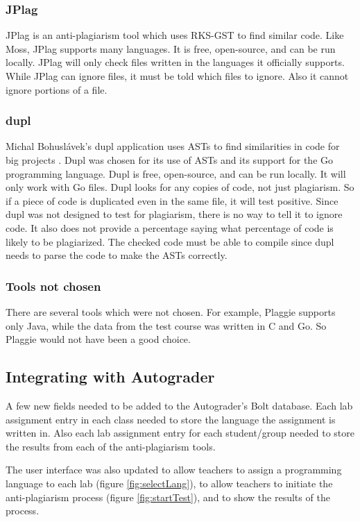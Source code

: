 \documentclass[10pt,journal,compsoc]{IEEEtran}
\begin{document}
			\subsubsection{JPlag}
			JPlag is an anti-plagiarism tool which uses RKS-GST to find similar code. Like Moss, JPlag supports many languages. It is free, open-source, and can be run locally. JPlag will only check files written in the languages it officially supports. While JPlag can ignore files, it must be told which files to ignore. Also it cannot ignore portions of a file.
		
			\subsubsection{dupl}
			Michal Bohuslávek's dupl application uses ASTs to find similarities in code for big projects \cite{bohuslave}. Dupl was chosen for its use of ASTs and its support for the Go programming language. Dupl is free, open-source, and can be run locally. It will only work with Go files. Dupl looks for any copies of code, not just plagiarism. So if a piece of code is duplicated even in the same file, it will test positive. Since dupl was not designed to test for plagiarism, there is no way to tell it to ignore code. It also does not provide a percentage saying what percentage of code is likely to be plagiarized. The checked code must be able to compile since dupl needs to parse the code to make the ASTs correctly.
		
			\subsubsection{Tools not chosen}
			There are several tools which were not chosen. For example, Plaggie supports only Java, while the data from the test course was written in C and Go. So Plaggie would not have been a good choice.
		
		\subsection{Integrating with Autograder}
		A few new fields needed to be added to the Autograder's Bolt database. Each lab assignment entry in each class needed to store the language the assignment is written in. Also each lab assignment entry for each student/group needed to store the results from each of the anti-plagiarism tools.
		
		The user interface was also updated to allow teachers to assign a programming language to each lab (figure \ref{fig:selectLang}), to allow teachers to initiate the anti-plagiarism process (figure \ref{fig:startTest}), and to show the results of the process. 
		
\end{document}
